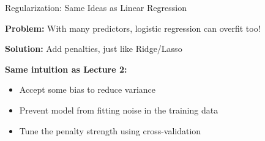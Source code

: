 \documentclass[10pt]{beamer}
\begin{document}
\begin{frame}{Regularization: Same Ideas as Linear Regression}

  \textbf{Problem:} With many predictors, logistic regression can overfit too!

  \vspace{1em}
  \textbf{Solution:} Add penalties, just like Ridge/Lasso

  \begin{center}
\renewcommand{\arraystretch}{1}
  \end{center}

  \vspace{1em}
  \textbf{Same intuition as Lecture 2:}
  \begin{itemize}
    \item Accept some bias to reduce variance
    \item Prevent model from fitting noise in the training data
    \item Tune the penalty strength using cross-validation
  \end{itemize}
\end{frame}

\end{document}
